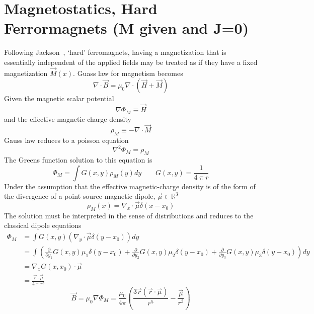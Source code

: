 \documentclass{article}         %
\theoremstyle{definition}
\theoremstyle{remark}
\begin{document}
\section{Magnetostatics, Hard Ferrormagnets (M given and J=0)}
Following Jackson~\cite{jackson1999classical}, `hard' ferromagnets,
having a magnetization that is essentially independent of the applied
fields may be treated as if they have a fixed magnetization $\vec{M}(x)$.
Guass law for magnetism becomes
\[
  \nabla \cdot \vec{B} = 
  \mu_0 \nabla \cdot (  \vec{H} + \vec{M}) 
\]
Given the magnetic scalar potential 
\[
   \nabla \Phi_M \equiv \vec{H}
\]
and the effective magnetic-charge density
\[
   \rho_M \equiv - \nabla \cdot  \vec{M}
\]
Gauss law reduces to a poisson equation
\[
   \nabla^2 \Phi_M = \rho_M 
\]
The Greens function solution to this equation is
\[
   \Phi_M = \int G(x,y) \rho_M(y) dy 
   \qquad
   G(x,y) = \frac{1}{4 \; \pi \; r}
\]
Under the assumption that the 
effective magnetic-charge density
is of the form of the divergence of a point source magnetic dipole,
$\vec{\mu}\in \mathbb{R}^3$
\[
   \rho_M  (x) = \nabla_x \cdot \vec{\mu} \delta(x - x_0)
\]
The solution must be interpreted in the sense of distributions
and reduces to the classical dipole equations
\[
\begin{split}
   \Phi_M & = \int G(x,y) ( \nabla_y \cdot \vec{\mu} \delta(y - x_0) ) dy 
    \\
          & = \int
               \left(
                \frac{\partial}{\partial y_1} G(x,y) \mu_1 \delta(y - x_0) 
                    +
                \frac{\partial}{\partial y_2} G(x,y) \mu_2 \delta(y - x_0) 
                    +
                \frac{\partial}{\partial y_3} G(x,y) \mu_3 \delta(y - x_0) 
               \right)
               dy 
    \\
          &  = \nabla_x G(x,x_0)  \cdot \vec{\mu} 
    \\
          & = \frac{\vec{r} \cdot \vec{\mu} }{ 4 \; \pi \; r^3}  
\end{split}
\]
\[
  \vec{B} = \mu_0 \nabla \Phi_M  =  \frac{\mu_0 }{ 4\pi} 
      \left( 
   \frac{ 3 \vec{r} (\vec{r} \cdot \vec{\mu})}{r^5}  - \frac{\vec{\mu}}{r^3}
     \right)
\]

\nocite{*}

\end{document}
